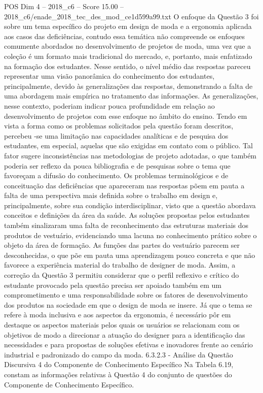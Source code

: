 \begin{textsample}{POS Dim 4 – 2018\_c6 – Score 15.00 – 2018\_c6/enade\_2018\_tec\_des\_mod\_ce1d599a99.txt}
O enfoque da Questão 3 foi sobre um tema específico do projeto em design de moda e a ergonomia aplicada aos casos das deficiências, contudo essa temática não compreende os enfoques comumente abordados no desenvolvimento de projetos de moda, uma vez que a coleção é um formato mais tradicional do mercado, e, portanto, mais enfatizado na formação dos estudantes.
Nesse sentido, o nível médio das respostas pareceu representar uma visão panorâmica do conhecimento dos estudantes, principalmente, devido às generalizações das respostas, demonstrando a falta de uma abordagem mais empírica no tratamento das informações.
As generalizações, nesse contexto, poderiam indicar pouca profundidade em relação ao desenvolvimento de projetos com esse enfoque no âmbito do ensino.
Tendo em vista a forma como os problemas solicitados pela questão foram descritos, percebeu -se uma limitação nas capacidades analíticas e de pesquisa dos estudantes, em especial, aquelas que são exigidas em contato com o público.
Tal fator sugere inconsistências nas metodologias de projeto adotadas, o que também poderia ser reflexo da pouca bibliografia e de pesquisas sobre o tema que favoreçam a difusão do conhecimento.
Os problemas terminológicos e de conceituação das deficiências que apareceram nas respostas põem em pauta a falta de uma perspectiva mais definida sobre o trabalho em design e, principalmente, sobre sua condição interdisciplinar, visto que a questão abordava conceitos e definições da área da saúde.
As soluções propostas pelos estudantes também sinalizaram uma falta de reconhecimento das estruturas materiais dos produtos de vestuário, evidenciando uma lacuna no conhecimento prático sobre o objeto da área de formação.
As funções das partes do vestuário parecem ser desconhecidas, o que põe em pauta uma aprendizagem pouco concreta e que não favorece a experiência material do trabalho de designer de moda.
Assim, a correção da Questão 3 permitiu considerar que o perfil reflexivo e crítico do estudante provocado pela questão precisa ser apoiado também em um comprometimento e uma responsabilidade sobre os fatores de desenvolvimento dos produtos na sociedade em que o design de moda se insere.
Já que o tema se refere à moda inclusiva e aos aspectos da ergonomia, é necessário pôr em destaque os aspectos materiais pelos quais os usuários se relacionam com os objetivos de modo a direcionar a atuação do designer para a identificação das necessidades e para propostas de soluções efetivas e inovadores frente ao cenário industrial e padronizado do campo da moda. 6.3.2.3 - Análise da Questão Discursiva 4 do Componente de Conhecimento Específico Na Tabela 6.19, constam as informações relativas à Questão 4 do conjunto de questões do Componente de Conhecimento Específico.

\end{textsample}
